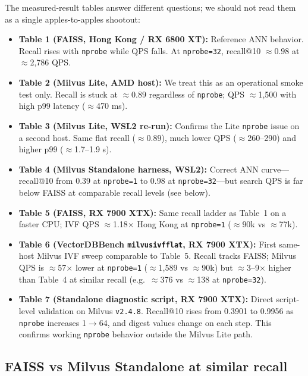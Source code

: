 \documentclass[11pt,a4paper]{article}
\begin{document}
The measured-result tables answer different questions; we should not read them as a
single apples-to-apples shootout:
\begin{itemize}[leftmargin=*]
  \item \textbf{Table 1 (FAISS, Hong Kong / RX 6800 XT):} Reference ANN behavior. Recall rises with
        \texttt{nprobe} while QPS falls. At \texttt{nprobe=32}, recall@10 $\approx 0.98$
        at $\approx$2{,}786 QPS.
  \item \textbf{Table 2 (Milvus Lite, AMD host):} We treat this as an operational smoke test
        only. Recall is stuck at $\approx 0.89$ regardless of \texttt{nprobe}; QPS $\approx$1{,}500 with
        high p99 latency ($\approx$470 ms).
  \item \textbf{Table 3 (Milvus Lite, WSL2 re-run):} Confirms the Lite \texttt{nprobe} issue
        on a second host. Same flat recall ($\approx 0.89$), much lower QPS
        ($\approx$260--290) and higher p99 ($\approx$1.7--1.9 s).
  \item \textbf{Table 4 (Milvus Standalone harness, WSL2):} Correct ANN curve---recall@10 from 0.39
        at \texttt{nprobe=1} to 0.98 at \texttt{nprobe=32}---but search QPS is far below
        FAISS at comparable recall levels (see below).
  \item \textbf{Table 5 (FAISS, RX 7900 XTX):} Same recall ladder as Table~1 on a faster CPU;
        IVF QPS $\approx$1.18$\times$ Hong Kong at \texttt{nprobe=1} ($\approx$90k vs $\approx$77k).
  \item \textbf{Table 6 (VectorDBBench \texttt{milvusivfflat}, RX 7900 XTX):} First same-host
        Milvus IVF sweep comparable to Table~5. Recall tracks FAISS; Milvus QPS is
        $\approx$57$\times$ lower at \texttt{nprobe=1} ($\approx$1{,}589 vs $\approx$90k) but
        $\approx$3--9$\times$ higher than Table~4 at similar recall (e.g.\ $\approx$376 vs
        $\approx$138 at \texttt{nprobe=32}).
  \item \textbf{Table 7 (Standalone diagnostic script, RX 7900 XTX):} Direct script-level
        validation on Milvus \texttt{v2.4.8}. Recall@10 rises from 0.3901 to 0.9956 as
        \texttt{nprobe} increases 1$\rightarrow$64, and digest values change on each step.
        This confirms working \texttt{nprobe} behavior outside the Milvus Lite path.
\end{itemize}

\subsection{FAISS vs Milvus Standalone at similar recall}
\end{document}
